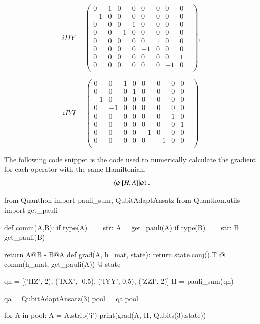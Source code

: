 \begin{equation}
	\label{eq:matrixiIIY}
	iIIY = \begin{pmatrix} 
	0 & 1 & 0 & 0 & 0 & 0 & 0 & 0 & \\ 
	-1 & 0 & 0 & 0 & 0 & 0 & 0 & 0 & \\ 
	0 & 0 & 0 & 1 & 0 & 0 & 0 & 0 & \\ 
	0 & 0 & -1 & 0 & 0 & 0 & 0 & 0 & \\ 
	0 & 0 & 0 & 0 & 0 & 1 & 0 & 0 & \\ 
	0 & 0 & 0 & 0 & -1 & 0 & 0 & 0 & \\ 
	0 & 0 & 0 & 0 & 0 & 0 & 0 & 1 & \\ 
	0 & 0 & 0 & 0 & 0 & 0 & -1 & 0 & \\
\end{pmatrix},
\end{equation}

\begin{equation}
	\label{eq:matrixiIYI}
	iIYI = \begin{pmatrix}   
	0 & 0 & 1 & 0 & 0 & 0 & 0 & 0 & \\
	0 & 0 & 0 & 1 & 0 & 0 & 0 & 0 & \\
	-1 & 0 & 0 & 0 & 0 & 0 & 0 & 0 & \\
	0 & -1 & 0 & 0 & 0 & 0 & 0 & 0 & \\
	0 & 0 & 0 & 0 & 0 & 0 & 1 & 0 & \\
	0 & 0 & 0 & 0 & 0 & 0 & 0 & 1 & \\
	0 & 0 & 0 & 0 & -1 & 0 & 0 & 0 & \\
	0 & 0 & 0 & 0 & 0 & -1 & 0 & 0 & \\
	\end{pmatrix}.
\end{equation}

The following code snippet is the code used to numerically calculate the gradient for each operator with the same Hamiltonian, \[ \braket{\psi|[H,A]|\psi}.  \] 
\begin{mycode}
from Quanthon import pauli_sum, QubitAdaptAnsatz
from Quanthon.utils import get_pauli

def comm(A,B):
    if type(A) == str:
	A = get_pauli(A)
    if type(B) == str:
	B = get_pauli(B)
    
    return A@B - B@A
def grad(A, h_mat, state):
    return state.conj().T @ comm(h_mat, get_pauli(A)) @ state

qh = [('IIZ', 2), ('IXX', -0.5), ('IYY', 0.5), ('ZZI', 2)]
H = pauli_sum(qh)

qa = QubitAdaptAnsatz(3)
pool = qa.pool

for A in pool:
    A = A.strip('i')
    print(grad(A, H, Qubits(3).state))
\end{mycode}


